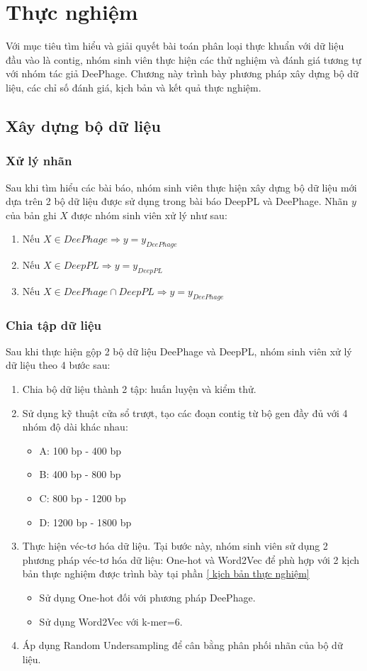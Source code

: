 \chapter{Thực nghiệm}
Với mục tiêu tìm hiểu và giải quyết bài toán phân loại thực khuẩn với dữ liệu đầu vào là contig, nhóm sinh viên thực hiện các thử nghiệm và đánh giá tương tự với nhóm tác giả DeePhage. Chương này trình bày phương pháp xây dựng bộ dữ liệu, các chỉ số đánh giá, kịch bản và kết quả thực nghiệm.

\section{ Xây dựng bộ dữ liệu}
\subsection{ Xử lý nhãn }
Sau khi tìm hiểu các bài báo, nhóm sinh viên thực hiện xây dựng bộ dữ liệu mới dựa trên 2 bộ dữ liệu được sử dụng trong bài báo DeepPL và DeePhage. Nhãn $y$ của bản ghi $X$ được nhóm sinh viên xử lý như sau:
\begin{enumerate}
    \item Nếu $X \in DeePhage \Rightarrow y = y_{DeePhage}$ 
    \item Nếu $X \in DeepPL \Rightarrow y = y_{DeepPL}$
    \item Nếu $X \in DeePhage \cap DeepPL \Rightarrow y = y_{DeePhage}$
\end{enumerate}

\subsection{ Chia tập dữ liệu}
Sau khi thực hiện gộp 2 bộ dữ liệu DeePhage và DeepPL, nhóm sinh viên xử lý dữ liệu theo 4 bước sau:
\begin{enumerate}
    \item Chia bộ dữ liệu thành 2 tập: huấn luyện và kiểm thử.
    \item Sử dụng kỹ thuật cửa sổ trượt, tạo các đoạn contig từ bộ gen đầy đủ với 4 nhóm độ dài khác nhau:
    \begin{itemize}
        \item A: 100 bp - 400 bp
        \item B: 400 bp - 800 bp
        \item C: 800 bp - 1200 bp
        \item D: 1200 bp - 1800 bp
    \end{itemize}
    \item Thực hiện véc-tơ hóa dữ liệu. Tại bước này, nhóm sinh viên sử dụng 2 phương pháp véc-tơ hóa dữ liệu: One-hot và Word2Vec để phù hợp với 2 kịch bản thực nghiệm được trình bày tại phần \ref{ kịch bản thực nghiệm}
    \begin{itemize}
        \item Sử dụng One-hot đối với phương pháp DeePhage.
        \item Sử dụng Word2Vec với k-mer=6.
    \end{itemize}
    \item Áp dụng Random Undersampling để cân bằng phân phối nhãn của bộ dữ liệu.
\end{enumerate}
